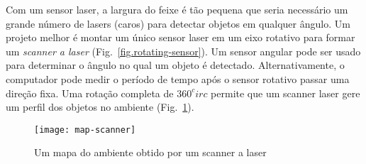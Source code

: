 
Com um sensor laser, a largura do feixe é tão pequena que seria necessário um grande número de lasers (caros) para detectar objetos em qualquer ângulo. Um projeto melhor é montar um único sensor laser em um eixo rotativo para formar um \emph{scanner a laser} (Fig.~\ref{fig.rotating-sensor}). Um sensor angular pode ser usado para determinar o ângulo no qual um objeto é detectado. Alternativamente, o computador pode medir o período de tempo após o sensor rotativo passar uma direção fixa. Uma rotação completa de $360^circ{}$ permite que um scanner laser gere um perfil dos objetos no ambiente (Fig.~\ref{fig.laser-scanner}).

\begin{figure}
\begin{center}
\texttt{[image: map-scanner]}
\end{center}
\caption{Um mapa do ambiente obtido por um scanner a laser}\label{fig.laser-scanner}
\end{figure}


